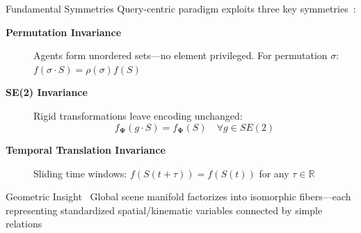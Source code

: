 \documentclass[10pt,aspectratio=169]{beamer}
\begin{document}
\begin{frame}{Fundamental Symmetries}
Query-centric paradigm exploits three key symmetries~\cite{qcnetZhou2023}:

\vspace{0.3cm}

\begin{description}
\item[\textbf{Permutation Invariance}]
Agents form unordered sets—no element privileged. For permutation $\sigma$: $f(\sigma \cdot S) = \rho(\sigma) f(S)$

\item[\textbf{SE(2) Invariance}]
Rigid transformations leave encoding unchanged:
\begin{equation}
f_{\boldsymbol{\Psi}}(g \cdot S) = f_{\boldsymbol{\Psi}}(S) \quad \forall g \in SE(2)
\end{equation}

\item[\textbf{Temporal Translation Invariance}]
Sliding time windows: $f(S(t+\tau)) = f(S(t))$ for any $\tau \in \mathbb{R}$
\end{description}

\begin{block}{Geometric Insight~\cite{qcnetZhou2023}}
Global scene manifold factorizes into isomorphic fibers—each representing standardized spatial/kinematic variables connected by simple relations
\end{block}
\end{frame}
\end{document}
